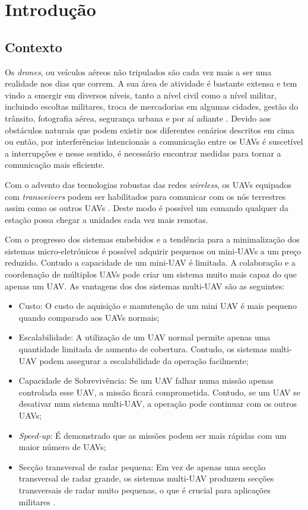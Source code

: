 \chapter{Introdução} \label{chap:intro}

\section{Contexto} \label{sec:context}

Os \textit{drones}, ou veículos aéreos não tripulados são cada vez mais a ser uma realidade nos dias que correm. A sua área de atividade é bastante extensa e tem vindo a emergir em diversos níveis, tanto a nível civil como a nível militar, incluindo escoltas militares, troca de mercadorias em algumas cidades, gestão do trânsito, fotografia aérea, segurança urbana e por aí adiante \cite{8255738}. Devido aos obstáculos naturais que podem existir nos diferentes cenários descritos em cima ou então, por interferências intencionais a comunicação entre os UAVs é suscetível a interrupções \cite{Secinti2018} e nesse sentido, é necessário encontrar medidas para tornar a comunicação mais eficiente.

Com o advento das tecnologias robustas das redes \textit{wireless}, os UAVs equipados com \textit{transceivers} podem ser habilitados para comunicar com os nós terrestres assim como os outros UAVs \cite{Morgenthaler2012a}. Deste modo é possível um comando qualquer da estação possa chegar a unidades cada vez mais remotas.

Com o progresso dos sistemas embebidos e a tendência para a minimalização dos sistemas micro-eletrónicos é possível adquirir pequenos ou mini-UAVs a um preço reduzido. Contudo a capacidade de um mini-UAV é limitada. A colaboração e a coordenação de múltiplos UAVs pode criar um sistema muito mais capaz do que apenas um UAV. As vantagens dos dos sistemas multi-UAV são as seguintes:
  \begin{itemize}
    \item{Custo: O custo de aquisição e manutenção de um mini UAV é mais pequeno quando comparado aos UAVs normais;}
    \item {Escalabilidade: A utilização de um UAV normal permite apenas uma quantidade limitada de aumento de cobertura. Contudo, os sistemas multi-UAV podem assegurar a escalabilidade da operação facilmente; }
    \item{ Capacidade de Sobrevivência: Se um UAV falhar numa missão apenas controlada esse UAV, a missão ficará comprometida. Contudo, se um UAV se desativar num sistema multi-UAV, a operação pode continuar com os outros UAVs;}
    \item{\textit{Speed-up}: É demonstrado que as missões podem ser mais rápidas com um maior número de UAVs;}
    \item{ Secção transversal de radar pequena: Em vez de apenas uma secção transversal de radar grande, os sistemas multi-UAV produzem secções transversais de radar muito pequenas, o que é crucial para aplicações militares \cite{Bekmezci2013a}.}
  \end{itemize}
  

